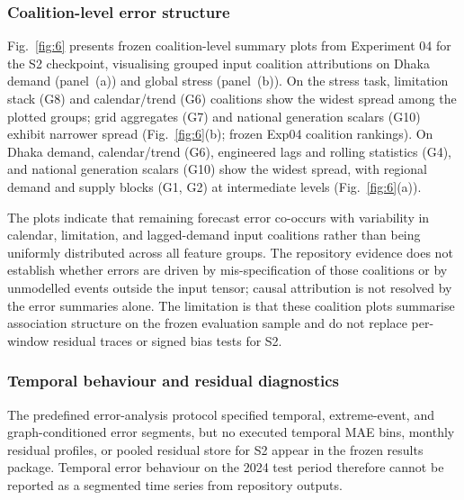 \subsubsection{Coalition-level error structure}\label{subsubsection:coalition_level_error_structure}

Fig.~\ref{fig:6} presents frozen coalition-level summary plots from Experiment 04 for the S2 checkpoint, visualising grouped input coalition attributions on Dhaka demand (panel~(a)) and global stress (panel~(b)). On the stress task, limitation stack (G8) and calendar/trend (G6) coalitions show the widest spread among the plotted groups; grid aggregates (G7) and national generation scalars (G10) exhibit narrower spread (Fig.~\ref{fig:6}(b); frozen Exp04 coalition rankings). On Dhaka demand, calendar/trend (G6), engineered lags and rolling statistics (G4), and national generation scalars (G10) show the widest spread, with regional demand and supply blocks (G1, G2) at intermediate levels (Fig.~\ref{fig:6}(a)).

The plots indicate that remaining forecast error co-occurs with variability in calendar, limitation, and lagged-demand input coalitions rather than being uniformly distributed across all feature groups. The repository evidence does not establish whether errors are driven by mis-specification of those coalitions or by unmodelled events outside the input tensor; causal attribution is not resolved by the error summaries alone. The limitation is that these coalition plots summarise association structure on the frozen evaluation sample and do not replace per-window residual traces or signed bias tests for S2.

\subsubsection{Temporal behaviour and residual diagnostics}\label{subsubsection:temporal_behaviour_and_residual_diagnostics}

The predefined error-analysis protocol specified temporal, extreme-event, and graph-conditioned error segments, but no executed temporal MAE bins, monthly residual profiles, or pooled residual store for S2 appear in the frozen results package. Temporal error behaviour on the 2024 test period therefore cannot be reported as a segmented time series from repository outputs.

